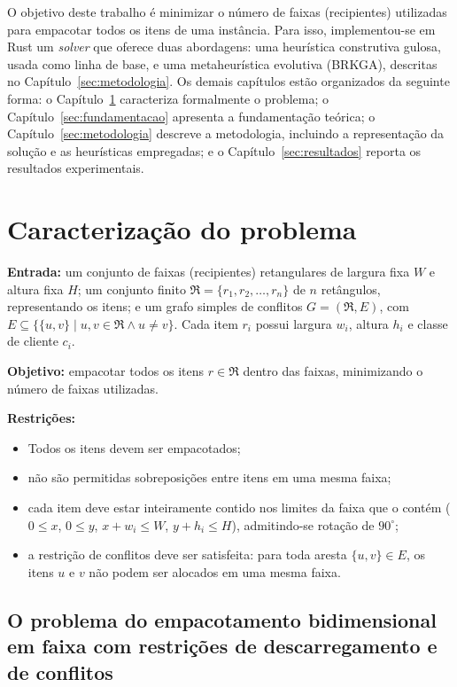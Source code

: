 \documentclass{report}
\begin{document}
O objetivo deste trabalho é minimizar o número de faixas (recipientes) utilizadas
para empacotar todos os itens de uma instância. Para isso, implementou-se em
Rust um \textit{solver} que oferece duas abordagens: uma heurística construtiva
gulosa, usada como linha de base, e uma metaheurística evolutiva (BRKGA),
descritas no Capítulo~\ref{sec:metodologia}. Os demais capítulos estão
organizados da seguinte forma: o Capítulo~\ref{sec:problema} caracteriza
formalmente o problema; o Capítulo~\ref{sec:fundamentacao} apresenta a
fundamentação teórica; o Capítulo~\ref{sec:metodologia} descreve a metodologia,
incluindo a representação da solução e as heurísticas empregadas; e o
Capítulo~\ref{sec:resultados} reporta os resultados experimentais.

\chapter{Caracterização do problema}
\label{sec:problema}

\textbf{Entrada:} um conjunto de faixas (recipientes) retangulares de largura
fixa $W$ e altura fixa $H$; um conjunto finito
$\Re = \{r_{1}, r_{2}, \ldots, r_{n}\}$ de $n$ retângulos, representando os
itens; e um grafo simples de conflitos $G=(\Re, E)$, com
$E\subseteq \{\{u,v\} \mid u,v\in \Re \wedge u \neq v\}$. Cada item $r_{i}$
possui largura $w_{i}$, altura $h_{i}$ e classe de cliente $c_{i}$.

\textbf{Objetivo:} empacotar todos os itens $r\in\Re$ dentro das faixas,
minimizando o número de faixas utilizadas.

\textbf{Restrições:}
\begin{itemize}
    \item Todos os itens devem ser empacotados;
    \item não são permitidas sobreposições entre itens em uma mesma faixa;
    \item cada item deve estar inteiramente contido nos limites da faixa que o
          contém ($0 \le x$, $0 \le y$, $x + w_i \le W$, $y + h_i \le H$),
          admitindo-se rotação de $90^\circ$;
    \item a restrição de conflitos deve ser satisfeita: para toda aresta
          $\{u,v\} \in E$, os itens $u$ e $v$ não podem ser alocados em uma
          mesma faixa.
\end{itemize}

\section{O problema do empacotamento bidimensional em faixa com restrições de descarregamento e de conflitos}
\end{document}
